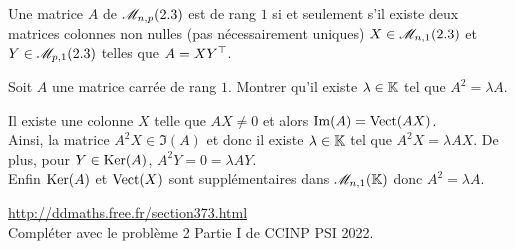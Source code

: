 \begin{prop}
    Une matrice $A$ de $\mathscr{M}_{n,p}(2.3)$ est de rang $1$ si et seulement s'il existe deux matrices colonnes non nulles (pas nécessairement uniques) $X \in \mathscr{M}_{n,1}(2.3)$ et $Y \in \mathscr{M}_{p,1}(2.3)$ telles que $A = X Y^\top$. 
\end{prop}

\begin{preuve}
\end{preuve}

\begin{exercice}
    Soit $A$ une matrice carrée de rang $1$. Montrer qu'il existe $\lambda \in \mathbb{K}$ tel que $A^2 = \lambda A$.
\end{exercice}

\begin{solution}
    Il existe une colonne $X$ telle que $AX \not= 0$ et alors $\Im(A) = \mathrm{Vect}(AX)$. \\
    Ainsi, la matrice $A^2X \in \Im(A)$ et donc il existe $\lambda \in \mathbb{K}$ tel que $A^2X = \lambda AX$. De plus, pour $Y \in \mathrm{Ker}(A)$, $A^2Y = 0 = \lambda AY$. \\
    Enfin $\mathrm{Ker}(A)$ et $\mathrm{Vect}(X)$ sont supplémentaires dans $\mathscr{M}_{n,1}(\mathbb{K})$ donc $A^2 = \lambda A$.
\end{solution}

\url{http://ddmaths.free.fr/section373.html} \\
Compléter avec le problème 2 Partie I de CCINP PSI 2022.